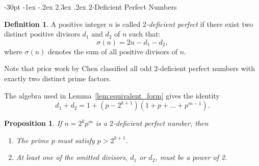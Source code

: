 \documentclass[10pt]{article}
\makeatletter
\renewcommand\section{\@startsection {section}{1}{\z@}
{-30pt \@plus -1ex \@minus -.2ex}
{2.3ex \@plus.2ex}
{\normalfont\normalsize\bfseries\boldmath}}
\newtheorem{proposition}{Proposition}
\theoremstyle{definition}
\newtheorem{definition}{Definition}
\makeatother
\begin{document}
\section{$2$-Deficient Perfect Numbers}
\label{sec:2deficient}


\begin{definition}
    A positive integer $n$ is called \emph{$2$-deficient perfect} if there exist two distinct positive divisors $d_1$ and $d_2$ of $n$ such that:
    \[\sigma(n) = 2n - d_1 - d_2,\]
    where $\sigma(n)$ denotes the sum of all positive divisors of $n$.
\end{definition}

Note that prior work by Chen \cite{Chen2019} classified all odd $2$-deficient perfect numbers with exactly two distinct prime factors. 

The algebra used in Lemma~\ref{lem:equivalent_form} gives the identity
\begin{equation}\label{eq:deficient_identity}
d_1+d_2=1+(p-2^{k+1})(1+p+\dots+p^{m-1}).
\end{equation}

\begin{proposition}\label{prop:2def_prelim}
    If $n=2^kp^m$ is a $2$-deficient perfect number, then
    \begin{enumerate}
        \item[(a)] The prime $p$ must satisfy $p > 2^{k+1}$.
        \item[(b)] At least one of the omitted divisors, $d_1$ or $d_2$, must be a power of 2.
    \end{enumerate}
\end{proposition}
\end{document}
